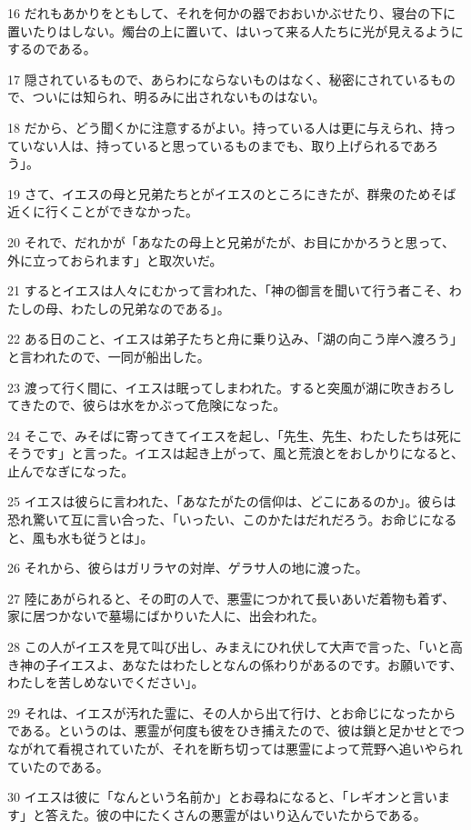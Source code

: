 \par 16 だれもあかりをともして、それを何かの器でおおいかぶせたり、寝台の下に置いたりはしない。燭台の上に置いて、はいって来る人たちに光が見えるようにするのである。
\par 17 隠されているもので、あらわにならないものはなく、秘密にされているもので、ついには知られ、明るみに出されないものはない。
\par 18 だから、どう聞くかに注意するがよい。持っている人は更に与えられ、持っていない人は、持っていると思っているものまでも、取り上げられるであろう」。
\par 19 さて、イエスの母と兄弟たちとがイエスのところにきたが、群衆のためそば近くに行くことができなかった。
\par 20 それで、だれかが「あなたの母上と兄弟がたが、お目にかかろうと思って、外に立っておられます」と取次いだ。
\par 21 するとイエスは人々にむかって言われた、「神の御言を聞いて行う者こそ、わたしの母、わたしの兄弟なのである」。
\par 22 ある日のこと、イエスは弟子たちと舟に乗り込み、「湖の向こう岸へ渡ろう」と言われたので、一同が船出した。
\par 23 渡って行く間に、イエスは眠ってしまわれた。すると突風が湖に吹きおろしてきたので、彼らは水をかぶって危険になった。
\par 24 そこで、みそばに寄ってきてイエスを起し、「先生、先生、わたしたちは死にそうです」と言った。イエスは起き上がって、風と荒浪とをおしかりになると、止んでなぎになった。
\par 25 イエスは彼らに言われた、「あなたがたの信仰は、どこにあるのか」。彼らは恐れ驚いて互に言い合った、「いったい、このかたはだれだろう。お命じになると、風も水も従うとは」。
\par 26 それから、彼らはガリラヤの対岸、ゲラサ人の地に渡った。
\par 27 陸にあがられると、その町の人で、悪霊につかれて長いあいだ着物も着ず、家に居つかないで墓場にばかりいた人に、出会われた。
\par 28 この人がイエスを見て叫び出し、みまえにひれ伏して大声で言った、「いと高き神の子イエスよ、あなたはわたしとなんの係わりがあるのです。お願いです、わたしを苦しめないでください」。
\par 29 それは、イエスが汚れた霊に、その人から出て行け、とお命じになったからである。というのは、悪霊が何度も彼をひき捕えたので、彼は鎖と足かせとでつながれて看視されていたが、それを断ち切っては悪霊によって荒野へ追いやられていたのである。
\par 30 イエスは彼に「なんという名前か」とお尋ねになると、「レギオンと言います」と答えた。彼の中にたくさんの悪霊がはいり込んでいたからである。
